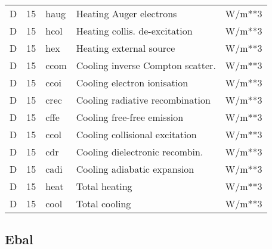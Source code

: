 \begin{table}[!p]
\begin{tabular}{lllll}
D & 15 & haug & Heating Auger electrons          & W/m**3           \\
D & 15 & hcol & Heating collis. de-excitation    & W/m**3           \\
D & 15 & hex  & Heating external source          & W/m**3           \\
D & 15 & ccom & Cooling inverse Compton scatter. & W/m**3           \\
D & 15 & ccoi & Cooling electron ionisation      & W/m**3           \\
D & 15 & crec & Cooling radiative recombination  & W/m**3           \\
D & 15 & cffe & Cooling free-free emission       & W/m**3           \\
D & 15 & ccol & Cooling collisional excitation   & W/m**3           \\
D & 15 & cdr  & Cooling dielectronic recombin.   & W/m**3           \\
D & 15 & cadi & Cooling adiabatic expansion      & W/m**3           \\
D & 15 & heat & Total heating                    & W/m**3           \\
D & 15 & cool & Total cooling                    & W/m**3           \\
\hline
\end{tabular}
\end{table}

\subsection{Ebal}

